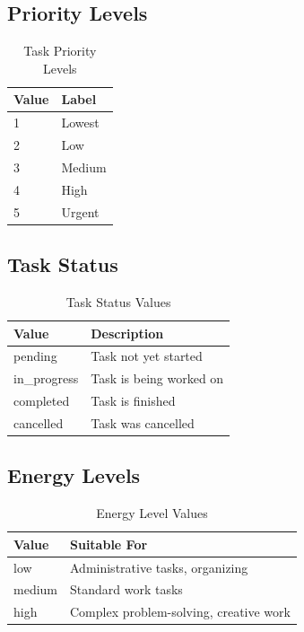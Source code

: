\documentclass[11pt,a4paper]{article}
\begin{document}
\subsection{Priority Levels}

\begin{table}[H]
\centering
\begin{tabular}{@{}ll@{}}
\toprule
\textbf{Value} & \textbf{Label} \\
\midrule
1 & Lowest \\
2 & Low \\
3 & Medium \\
4 & High \\
5 & Urgent \\
\bottomrule
\end{tabular}
\caption{Task Priority Levels}
\end{table}

\subsection{Task Status}

\begin{table}[H]
\centering
\begin{tabular}{@{}ll@{}}
\toprule
\textbf{Value} & \textbf{Description} \\
\midrule
pending & Task not yet started \\
in\_progress & Task is being worked on \\
completed & Task is finished \\
cancelled & Task was cancelled \\
\bottomrule
\end{tabular}
\caption{Task Status Values}
\end{table}

\subsection{Energy Levels}

\begin{table}[H]
\centering
\begin{tabular}{@{}ll@{}}
\toprule
\textbf{Value} & \textbf{Suitable For} \\
\midrule
low & Administrative tasks, organizing \\
medium & Standard work tasks \\
high & Complex problem-solving, creative work \\
\bottomrule
\end{tabular}
\caption{Energy Level Values}
\end{table}
\end{document}
